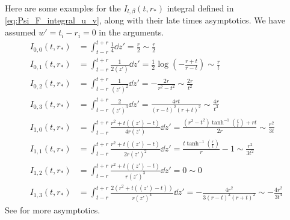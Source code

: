 \label{sec:Psi_details}


\label{sec:Psi_F_details}
Here are some examples for the $I_{l,\beta}(t,r_*)$ integral defined in \eqref{eq:Psi_F_integral_u_v}, along with their late times asymptotics.
We have assumed $w'=t_i-r_i=0$ in the arguments.
\begin{align}
  \label{eq:I_integral_examples}
  I_{0,0}(t,r_*) &= \int_{t-r}^{t+r} \frac{1}{4} \dd{z'} = \frac{r}{2} \sim \frac{r}{2} \nonumber \\
I_{0,1}(t,r_*) &= \int_{t-r}^{t+r} \frac{1}{2 (z')} \dd{z'} = \frac{1}{2} \log \left(-\frac{r+t}{r-t}\right) \sim \frac{r}{t} \nonumber \\
I_{0,2}(t,r_*) &= \int_{t-r}^{t+r} \frac{1}{(z')^2} \dd{z'} = -\frac{2 r}{r^2-t^2} \sim \frac{2 r}{t^2} \nonumber \\
I_{0,3}(t,r_*) &= \int_{t-r}^{t+r} \frac{2}{(z')^3} \dd{z'} = \frac{4 r t}{(r-t)^2 (r+t)^2} \sim \frac{4 r}{t^3} \nonumber \\
I_{1,0}(t,r_*) &= \int_{t-r}^{t+r} \frac{r^2+t ((z')-t)}{4 r (z')} \dd{z'} = \frac{\left(r^2-t^2\right) \tanh ^{-1}\left(\frac{r}{t}\right)+r t}{2 r} \sim \frac{r^2}{3 t} \nonumber \\
I_{1,1}(t,r_*) &= \int_{t-r}^{t+r} \frac{r^2+t ((z')-t)}{2 r (z')^2} \dd{z'} = \frac{t \tanh ^{-1}\left(\frac{r}{t}\right)}{r}-1 \sim \frac{r^2}{3 t^2} \nonumber \\
I_{1,2}(t,r_*) &= \int_{t-r}^{t+r} \frac{r^2+t ((z')-t)}{r (z')^3} \dd{z'} = 0 \sim 0 \nonumber \\
I_{1,3}(t,r_*) &= \int_{t-r}^{t+r} \frac{2 \left(r^2+t ((z')-t)\right)}{r (z')^4} \dd{z'} = -\frac{4 r^2}{3 (r-t)^2 (r+t)^2} \sim -\frac{4 r^2}{3 t^4}
\end{align}
See  for more asymptotics.


